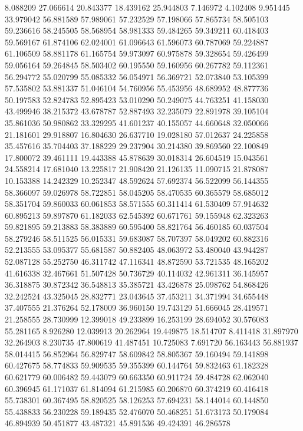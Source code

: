 8.088209
27.066614
20.843377
18.439162
25.944803
7.146972
4.102408
9.951445
33.979042
56.881589
57.989061
57.232529
57.198066
57.865734
58.505103
59.236616
58.245505
58.568954
58.981333
59.484265
59.349211
60.418403
59.569167
61.874106
62.024001
61.096643
61.596073
60.787069
59.224887
61.106509
58.881178
61.165754
59.973097
60.975878
59.328654
59.426499
59.056164
59.264845
58.503402
60.195550
59.160956
60.267782
59.112361
56.294772
55.020799
55.085332
56.054971
56.369721
52.073840
53.105399
57.535802
53.881337
51.046104
54.760956
55.453956
48.689952
48.877736
50.197583
52.824783
52.895423
53.010290
50.249075
44.763251
41.158030
43.499946
38.215372
43.678787
52.887493
32.235079
22.891978
39.105104
35.861036
50.980862
33.329295
41.601237
40.155057
44.660648
32.050066
21.181601
29.918807
16.804630
26.637710
19.028180
57.012637
24.225858
35.457616
35.704403
37.188229
29.237904
30.214380
39.869560
22.100849
17.800072
39.461111
19.443388
45.878639
30.018314
26.604519
15.043561
24.558214
17.681040
13.225817
21.908420
21.126135
11.090715
21.878087
10.153388
14.242329
10.252347
48.592624
57.692374
56.522099
56.144355
58.366097
59.026978
58.722851
58.045205
58.470535
60.365579
58.685012
58.351704
59.860033
60.061853
58.571555
60.311414
61.530409
57.914632
60.895213
59.897870
61.182033
62.545392
60.671761
59.155948
62.323263
59.821895
59.213883
58.383889
60.595400
58.821764
56.460185
60.037504
58.279246
58.511525
56.015331
59.683087
58.707397
58.049202
60.882316
52.213555
53.095377
55.681587
50.882405
48.063972
53.480040
43.944287
52.087128
55.252750
46.311742
47.116341
48.872590
53.721535
48.165202
41.616338
32.467661
51.507428
50.736729
40.114032
42.961311
36.145957
36.318875
30.872342
36.548813
35.385721
43.426878
25.098762
54.868426
32.242524
43.325045
28.832771
23.043645
37.453211
34.371994
34.655448
37.407555
21.376264
52.178009
36.960150
19.743129
51.666045
28.419571
21.258555
28.730999
12.399018
49.233899
16.253199
28.694052
30.576083
55.281165
8.926280
12.039913
20.262964
19.449875
18.514707
8.411418
31.897970
32.264903
8.230735
47.800619
41.487451
10.725083
7.691720
56.163443
56.881937
58.014415
56.852964
56.829747
58.609842
58.805367
59.160494
59.141898
60.427675
58.774833
59.909535
59.355399
60.144764
59.832463
61.182328
60.621779
60.006482
59.443079
60.663350
60.911724
59.484728
62.062040
60.396945
61.171037
61.814094
61.215985
60.206870
60.374219
60.416418
55.738301
60.367495
58.820525
58.126253
57.694231
58.144014
60.144850
55.438833
56.230228
59.189435
52.476070
50.468251
51.673173
50.179084
46.894939
50.451877
43.487321
45.891536
49.424391
46.286578
